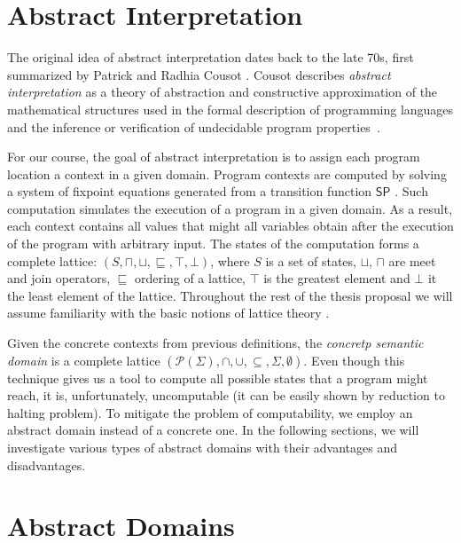 \section{Abstract Interpretation}

The original idea of abstract interpretation dates back to the late 70s, first
summarized by Patrick and Radhia Cousot \cite{Cousot1977}.
Cousot describes \emph{abstract interpretation} as a theory of abstraction and
constructive approximation of the mathematical structures used in the formal
description of programming languages and the inference or verification of
undecidable program properties~\cite{Cousot2012}.


For our course, the goal of abstract interpretation is to assign each program
location a context in a given domain. Program contexts are computed by solving
a system of fixpoint equations generated from a transition function
$\textsf{SP}$ \cite{Cousot1977}. Such computation simulates the execution of a
program in a given domain. As a result, each context contains all values that
might all variables obtain after the execution of the program with arbitrary
input. The states of the computation forms a complete
lattice: $(S, \sqcap, \sqcup, \sqsubseteq, \top, \bot)$, where $S$ is a set of
states, $\sqcup$, $\sqcap$ are meet and join operators, $\sqsubseteq$ ordering
of a lattice, $\top$ is the greatest element and $\bot$ it the least element of
the lattice. Throughout the rest of the thesis proposal we will assume
familiarity with the basic notions of lattice theory \cite{Birkhoff1940}.

Given the concrete contexts from previous definitions, the \emph{concretp
semantic domain} is a complete lattice $(\mathcal{P}(\Sigma), \cap, \cup,
\subseteq, \Sigma, \emptyset)$. Even though this technique gives us a tool to
compute all possible states that a program might reach, it is, unfortunately,
uncomputable (it can be easily shown by reduction to halting problem). To
mitigate the problem of computability, we employ an abstract domain instead of
a concrete one. In the following sections, we will investigate various types of
abstract domains with their advantages and disadvantages.

\section{Abstract Domains}


